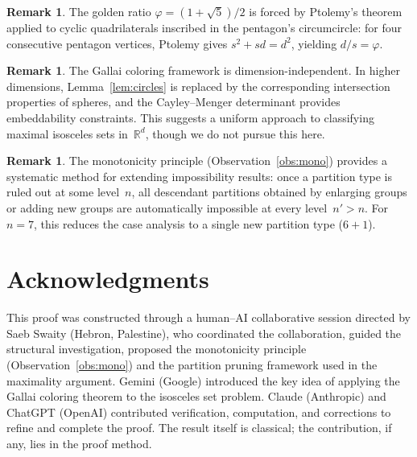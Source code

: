 \documentclass[12pt]{amsart}
\theoremstyle{definition}
\newtheorem{remark}[theorem]{Remark}
\begin{document}
\begin{remark}
The golden ratio $\varphi = (1+\sqrt{5})/2$ is forced by Ptolemy's theorem applied to cyclic quadrilaterals inscribed in the pentagon's circumcircle: for four consecutive pentagon vertices, Ptolemy gives $s^2 + sd = d^2$, yielding $d/s = \varphi$.
\end{remark}

\begin{remark}
The Gallai coloring framework is dimension-independent. In higher dimensions, Lemma~\ref{lem:circles} is replaced by the corresponding intersection properties of spheres, and the Cayley--Menger determinant provides embeddability constraints. This suggests a uniform approach to classifying maximal isosceles sets in~$\mathbb{R}^d$, though we do not pursue this here.
\end{remark}

\begin{remark}
The monotonicity principle (Observation~\ref{obs:mono}) provides a systematic method for extending impossibility results: once a partition type is ruled out at some level~$n$, all descendant partitions obtained by enlarging groups or adding new groups are automatically impossible at every level~$n' > n$. For $n = 7$, this reduces the case analysis to a single new partition type ($6{+}1$).
\end{remark}

\section*{Acknowledgments}

This proof was constructed through a human--AI collaborative session directed by Saeb Swaity (Hebron, Palestine), who coordinated the collaboration, guided the structural investigation, proposed the monotonicity principle (Observation~\ref{obs:mono}) and the partition pruning framework used in the maximality argument. Gemini (Google) introduced the key idea of applying the Gallai coloring theorem to the isosceles set problem. Claude (Anthropic) and ChatGPT (OpenAI) contributed verification, computation, and corrections to refine and complete the proof. The result itself is classical; the contribution, if any, lies in the proof method.
\end{document}
